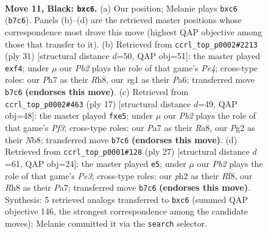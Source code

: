 \documentclass[11pt]{article}
\begin{document}
\clearpage

\begin{figure}[p]\centering
\begin{subfigure}{0.46\textwidth}\centering
\resizebox{\linewidth}{!}{%
\newchessgame
\chessboard[
  setfen={r1bk1b1r/ppp2ppp/2P5/8/8/8/PPP2PpP/RNB1K1R1 b Q - 1 11},
  showmover=false,
  pgfstyle=straightmove, color=movearrow, markmove={b7-c6}
]}
\caption{}
\end{subfigure}\hfill
\begin{subfigure}{0.46\textwidth}\centering
\resizebox{\linewidth}{!}{%
\newchessgame
\chessboard[
  setfen={r1b1k2r/1p3ppp/p7/3Rp3/P4P2/8/1PP3PP/2K2B1R b kq - 0 16},
  showmover=false,
  pgfstyle=straightmove, color=movearrow, markmove={e5-f4}
]}
\caption{}
\end{subfigure}
\\[4pt]
\begin{subfigure}{0.46\textwidth}\centering
\resizebox{\linewidth}{!}{%
\newchessgame
\chessboard[
  setfen={rnb1k2r/ppp1bp1p/5p2/4P3/4N3/3B4/PPP2PPP/R3K1NR b KQkq - 0 9},
  showmover=false,
  pgfstyle=straightmove, color=movearrow, markmove={f6-e5}
]}
\caption{}
\end{subfigure}\hfill
\begin{subfigure}{0.46\textwidth}\centering
\resizebox{\linewidth}{!}{%
\newchessgame
\chessboard[
  setfen={r1b2rk1/pp3p2/4pp1p/8/1nBN4/4P3/PP3PPP/2R1K2R b K - 0 14},
  showmover=false,
  pgfstyle=straightmove, color=movearrow, markmove={e6-e5}
]}
\caption{}
\end{subfigure}
\caption{\textbf{Move 11, Black: \texttt{bxc6}.} (a) Our position; Melanie plays \texttt{bxc6} (\texttt{b7c6}). Panels (b)--(d) are the retrieved master positions whose correspondence most drove this move (highest QAP objective among those that transfer to it). (b) Retrieved from \texttt{ccrl\_top\_p0002\#2213} (ply 31) [structural distance $d$=50, QAP obj=51]: the master played \texttt{exf4}; under $\mu$ our \emph{Pb2} plays the role of that game's \emph{Pe4}; cross-type roles: our \emph{P}h7 as their \emph{R}h8, our \emph{r}g1 as their \emph{P}a6; transferred move \texttt{b7c6} \textbf{(endorses this move)}. (c) Retrieved from \texttt{ccrl\_top\_p0002\#463} (ply 17) [structural distance $d$=49, QAP obj=48]: the master played \texttt{fxe5}; under $\mu$ our \emph{Pb2} plays the role of that game's \emph{Pf3}; cross-type roles: our \emph{P}a7 as their \emph{R}a8, our \emph{P}g2 as their \emph{N}b8; transferred move \texttt{b7c6} \textbf{(endorses this move)}. (d) Retrieved from \texttt{ccrl\_top\_p0001\#128} (ply 27) [structural distance $d$=61, QAP obj=24]: the master played \texttt{e5}; under $\mu$ our \emph{Pb2} plays the role of that game's \emph{Pe3}; cross-type roles: our \emph{p}h2 as their \emph{R}f8, our \emph{R}h8 as their \emph{P}a7; transferred move \texttt{b7c6} \textbf{(endorses this move)}. Synthesis: 5 retrieved analogs transferred to \texttt{bxc6} (summed QAP objective 146, the strongest correspondence among the candidate moves); Melanie committed it via the \texttt{search} selector.}
\label{fig:thought-m21}
\end{figure}
\end{document}

